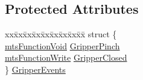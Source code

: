 \subsection*{Protected Attributes}
\begin{DoxyCompactItemize}
\item 
\begin{tabbing}
xx\=xx\=xx\=xx\=xx\=xx\=xx\=xx\=xx\=\kill
struct \{\\
\>\hyperlink{classmts_function_void}{mtsFunctionVoid} \hyperlink{classmts_intuitive_research_kit_m_t_m_acf5b18a7bb385172688a4f8fafcc24d7}{GripperPinch}\\
\>\hyperlink{classmts_function_write}{mtsFunctionWrite} \hyperlink{classmts_intuitive_research_kit_m_t_m_ac2406f66a4880a35ef854e85843d4c8e}{GripperClosed}\\
\} \hyperlink{classmts_intuitive_research_kit_m_t_m_a9210a8fb459404cd847f50717b5450a1}{GripperEvents}\\


\end{tabbing}
\end{DoxyCompactItemize}
